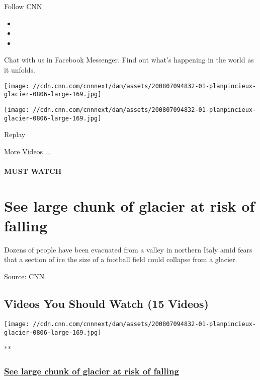 Follow CNN

\begin{itemize}
\item
\item
\item
\end{itemize}

Chat with us in Facebook Messenger. Find out what's happening in the
world as it unfolds.

\texttt{[image: //cdn.cnn.com/cnnnext/dam/assets/200807094832-01-planpincieux-glacier-0806-large-169.jpg]}

\texttt{[image: //cdn.cnn.com/cnnnext/dam/assets/200807094832-01-planpincieux-glacier-0806-large-169.jpg]}\href{javascript:void(0);}{}

Replay

\href{/videos}{More Videos ...}

\hypertarget{must-watch}{%
\paragraph{MUST WATCH}\label{must-watch}}

\hypertarget{see-large-chunk-of-glacier-at-risk-of-falling}{%
\section{See large chunk of glacier at risk of
falling}\label{see-large-chunk-of-glacier-at-risk-of-falling}}

Dozens of people have been evacuated from a valley in northern Italy
amid fears that a section of ice the size of a football field could
collapse from a glacier.

Source: CNN

\hypertarget{videos-you-should-watch-15-videos}{%
\subsection{Videos You Should Watch (15
Videos)}\label{videos-you-should-watch-15-videos}}

\href{/videos/world/2020/08/07/evacuation-glacier-collapse-mont-blanc-italy-lon-orig-na.cnn}{}

\texttt{[image: //cdn.cnn.com/cnnnext/dam/assets/200807094832-01-planpincieux-glacier-0806-large-169.jpg]}

**

\hypertarget{see-large-chunk-of-glacier-at-risk-of-falling-1}{%
\subsubsection{\texorpdfstring{\href{/videos/world/2020/08/07/evacuation-glacier-collapse-mont-blanc-italy-lon-orig-na.cnn}{See
large chunk of glacier at risk of
falling}}{See large chunk of glacier at risk of falling}}\label{see-large-chunk-of-glacier-at-risk-of-falling-1}}


